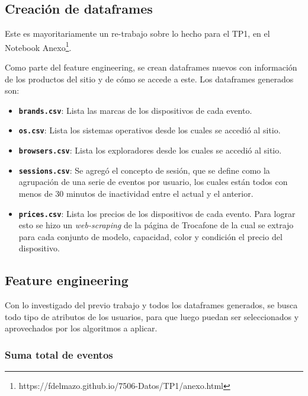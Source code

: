 \documentclass[a4paper]{article}
\begin{document}
\subsection{Creación de dataframes}

Este es mayoritariamente un re-trabajo sobre lo hecho para el TP1, en el Notebook Anexo\footnote{https://fdelmazo.github.io/7506-Datos/TP1/anexo.html}.

Como parte del feature engineering, se crean dataframes nuevos con información de los productos del sitio y de cómo se accede a este. Los dataframes generados son:

\begin{itemize}
	\item \textbf{\texttt{brands.csv}}: Lista las marcas de los dispositivos de cada evento.
	\item \textbf{\texttt{os.csv}}: Lista los sistemas operativos desde los cuales se accedió al sitio.
	\item \textbf{\texttt{browsers.csv}}: Lista los exploradores desde los cuales se accedió al sitio.
	\item \textbf{\texttt{sessions.csv}}:  Se agregó el concepto de sesión, que se define como la agrupación de una serie de eventos por usuario, los cuales están todos con menos de 30 minutos de inactividad entre el actual y el anterior. 
	\item \textbf{\texttt{prices.csv}}: Lista los precios de los dispositivos de cada evento. Para lograr esto se hizo un \textit{web-scraping} de la página de Trocafone de la cual se extrajo para cada conjunto de modelo, capacidad, color y condición el precio del dispositivo.
\end{itemize}

\subsection{Feature engineering}

Con lo investigado del previo trabajo y todos los dataframes generados, se busca todo tipo de atributos de los usuarios, para que luego puedan ser seleccionados y aprovechados por los algoritmos a aplicar.

\subsubsection{Suma total de eventos}

\begin{sloppypar}
\texttt{}
\end{sloppypar}
\end{document}
